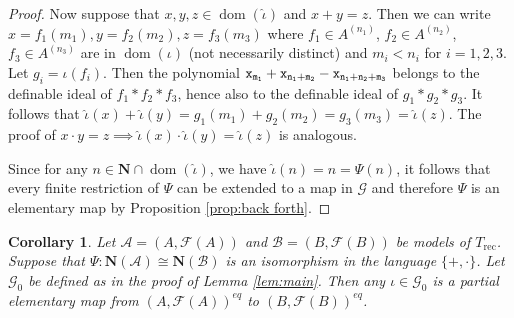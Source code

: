 \documentclass{amsart}
\newcommand{\ca}{\mathcal}
\newcommand{\dom}{\operatorname{dom}}
\theoremstyle{plain}
\newtheorem{cor}[thm]{Corollary}
\theoremstyle{definition}
\newcommand{\F}{\mathcal{F}}
\newcommand{\hn}{\mathbf N}
\begin{document}
\begin{proof}
Now suppose that $x,y,z\in \dom(\hat \iota)$ and $x+y= z$. Then we can write $x = f_1(m_1), y=f_2(m_2), z= f_3(m_3)$ where $f_1 \in A^{(n_1)}$, $f_2\in A^{(n_2)}$, $f_3 \in A^{(n_3)}$ are in $ \dom(\iota)$ (not necessarily distinct) and $m_i<n_i$ for $i=1,2,3$. Let $g_i = \iota(f_i)$. Then the polynomial $\tt x_{m_1} + \tt x_{n_1+m_2} - \tt x_{n_1+n_2+m_3}$ belongs to the definable ideal of $f_1*f_2*f_3$, hence also to the definable ideal of $g_1*g_2*g_3$. It follows that $\hat \iota (x) + \hat \iota(y) = g_1(m_1) + g_2(m_2) = g_3(m_3) =  \hat \iota (z)$. 
The proof of $x\cdot y= z \implies \hat \iota(x)\cdot \hat \iota(y) = \hat \iota(z)$ is analogous. 

Since for any $n\in \hn \cap \dom(\hat \iota)$, we have $\hat \iota (n) = n = \Psi(n)$, it follows that every finite restriction of $\Psi$ can be extended to a map in $\ca G$ and therefore $\Psi$ is an elementary map by Proposition \ref{prop:back forth}. 
\end{proof}

\begin{cor}\label{cor:iota elementary} Let $\mathcal A= (A, \F (A))$ and $\mathcal B = (B, \F(B))$ be models of $T_{\text{rec}}$. Suppose that $\Psi: \hn(\ca A) \cong \hn (\ca B)$ is an isomorphism in the language $\{+,\cdot\}$. Let $\ca G_0$ be defined as in the proof of Lemma \ref{lem:main}. Then any $\iota \in \ca G_0$ is a partial elementary map from $(A, \F(A))^{eq}$ to $(B, \F(B))^{eq}$. 
\end{cor}
\end{document}
